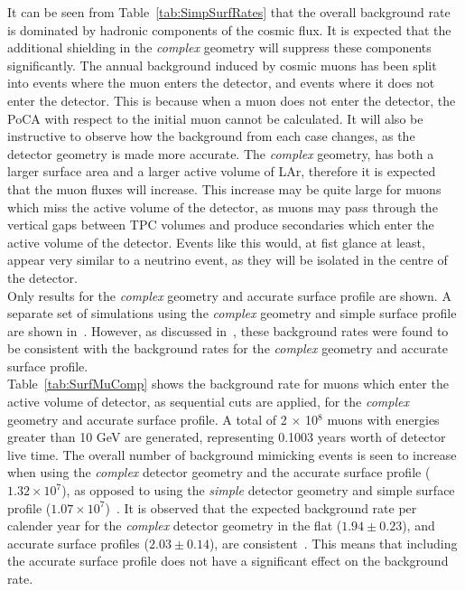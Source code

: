 It can be seen from Table~\ref{tab:SimpSurfRates} that the overall background rate is dominated by hadronic components of the cosmic flux. It is expected that the additional shielding in the \emph{complex} geometry will suppress these components significantly. The annual background induced by cosmic muons has been split into events where the muon enters the detector, and events where it does not enter the detector. This is because when a muon does not enter the detector, the PoCA with respect to the initial muon cannot be calculated. It will also be instructive to observe how the background from each case changes, as the detector geometry is made more accurate. The \emph{complex} geometry, has both a larger surface area and a larger active volume of LAr, therefore it is expected that the muon fluxes will increase. This increase may be quite large for muons which miss the active volume of the detector, as muons may pass through the vertical gaps between TPC volumes and produce secondaries which enter the active volume of the detector. Events like this would, at fist glance at least, appear very similar to a neutrino event, as they will be isolated in the centre of the detector. \\

Only results for the \emph{complex} geometry and accurate surface profile are shown. A separate set of simulations using the \emph{complex} geometry and simple surface profile are shown in~\citep{MartinsThesis}. However, as discussed in~\citep{MartinsThesis}, these background rates were found to be consistent with the background rates for the \emph{complex} geometry and accurate surface profile. \\

Table~\ref{tab:SurfMuComp} shows the background rate for muons which enter the active volume of detector, as sequential cuts are applied, for the \emph{complex} geometry and accurate surface profile. A total of 2 $\times$ 10$^8$ muons with energies greater than 10 GeV are generated, representing 0.1003 years worth of detector live time. The overall number of background mimicking events is seen to increase when using the \emph{complex} detector geometry and the accurate surface profile ($1.32\times10^7$), as opposed to using the \emph{simple} detector geometry and simple surface profile ($1.07\times10^7$)~\citep{MartinsThesis}. It is observed that the expected background rate per calender year for the \emph{complex} detector geometry in the flat ($1.94\pm0.23$), and accurate surface profiles ($2.03\pm0.14$), are consistent~\citep{MartinsThesis}. This means that including the accurate surface profile does not have a significant effect on the background rate. \\

